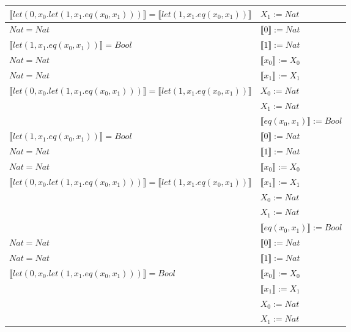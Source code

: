 \begin{exercise}
\begin{description}
\begin{center}
\begin{longtable}{ | l | l | }
                        $ \llbracket let(0,x_0.let(1,x_1.eq(x_0,x_1))) \rrbracket =  \llbracket let(1,x_1.eq(x_0,x_1)) \rrbracket$ &   $ X_1 := Nat $ \\
                      \hline
                        $Nat = Nat$ & $ \llbracket 0 \rrbracket := Nat$ \\
                        $ \llbracket let(1,x_1.eq(x_0,x_1)) \rrbracket = Bool$  &    $ \llbracket 1 \rrbracket := Nat$ \\    
                        $Nat = Nat$  & $ \llbracket x_0 \rrbracket := X_0$  \\  
                        $Nat = Nat$ & $ \llbracket x_1 \rrbracket := X_1$ \\   
                        $ \llbracket let(0,x_0.let(1,x_1.eq(x_0,x_1))) \rrbracket =  \llbracket let(1,x_1.eq(x_0,x_1)) \rrbracket$ & $X_0 := Nat$ \\ 
				   &   $ X_1 := Nat $ \\
				   &   $ \llbracket eq(x_0,x_1) \rrbracket  := Bool$ \\
                      \hline
                        $ \llbracket let(1,x_1.eq(x_0,x_1)) \rrbracket = Bool$  &   $ \llbracket 0 \rrbracket := Nat$ \\ 
                        $Nat = Nat$  &  $ \llbracket 1 \rrbracket := Nat$ \\  
                        $Nat = Nat$ &  $ \llbracket x_0 \rrbracket := X_0$  \\ 
                        $ \llbracket let(0,x_0.let(1,x_1.eq(x_0,x_1))) \rrbracket =  \llbracket let(1,x_1.eq(x_0,x_1)) \rrbracket$ &  $ \llbracket x_1 \rrbracket := X_1$ \\  
				  &    $X_0 := Nat$ \\ 
				   &   $ X_1 := Nat $ \\
				   &   $ \llbracket eq(x_0,x_1) \rrbracket  := Bool$ \\
                      \hline
                        $Nat = Nat$  &   $ \llbracket 0 \rrbracket := Nat$ \\ 
                        $Nat = Nat$ &  $ \llbracket 1 \rrbracket := Nat$ \\    
                        $ \llbracket let(0,x_0.let(1,x_1.eq(x_0,x_1))) \rrbracket =  Bool$ &  $ \llbracket x_0 \rrbracket := X_0$  \\   
				  &   $ \llbracket x_1 \rrbracket := X_1$ \\  
				  &    $X_0 := Nat$ \\ 
				   &   $ X_1 := Nat $ \\

\end{longtable}
\end{center}
\end{description}
\end{exercise}
